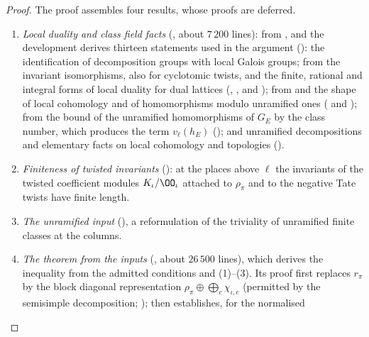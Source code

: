 \begin{proof}
The proof assembles four results, whose proofs are deferred.
\begin{enumerate}[label=(\arabic*)]
\item \emph{Local duality and class field facts} (, about $7\,200$ lines): from
  \shhodgeGAR, \shhodgeLTD{} and \shhodgeLEC{} the development derives thirteen statements used in the argument
  (): the identification of decomposition groups with local Galois groups; from \shhodgeLTD{}
  the invariant isomorphisms, also for cyclotomic twists, and the finite, rational and integral forms of local duality for dual lattices
  (, , and ); from \shhodgeLTD{} and \shhodgeLEC{} the shape of local cohomology and of
  homomorphisms modulo unramified ones ( and ); from \shhodgeGAR{} the bound of the unramified homomorphisms of $G_E$
  by the class number, which produces the term $v_\ell(h_E)$ ();
  and unramified decompositions and elementary facts on local cohomology and topologies
  ().
\item \emph{Finiteness of twisted invariants} (): at the places above $\ell$ the invariants of the
  twisted coefficient modules $K_\iota/\OO_\iota$ attached to $\rho_\pi$ and to the negative Tate twists have finite length.
\item \emph{The unramified input} (), a reformulation of the triviality of unramified
  finite classes at the columns.
\item \emph{The theorem from the inputs} (, about $26\,500$ lines), which derives the
  inequality from the admitted conditions and (1)--(3). Its proof first replaces $r_\pi$ by the block diagonal representation $\rho_\pi\oplus\bigoplus_c
  \chi_{\iota,c}$ (permitted by the semisimple decomposition; ); then establishes, for the normalised

\end{enumerate}
\end{proof}
